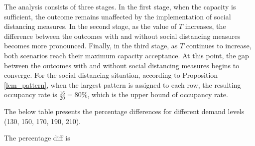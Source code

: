 The analysis consists of three stages. 
In the first stage, when the capacity is sufficient, the outcome remains unaffected by the implementation of social distancing measures. In the second stage, as the value of $T$ increases, the difference between the outcomes with and without social distancing measures becomes more pronounced. Finally, in the third stage, as $T$ continues to increase, both scenarios reach their maximum capacity acceptance. At this point, the gap between the outcomes with and without social distancing measures begins to converge. For the social distancing situation, according to Proposition \ref{lem_pattern}, when the largest pattern is assigned to each row, the resulting occupancy rate is $\frac{16}{20} = 80\%$, which is the upper bound of occupancy rate.


The below table presents the percentage differences for different demand levels (130, 150, 170, 190, 210).

The percentage diff is 


